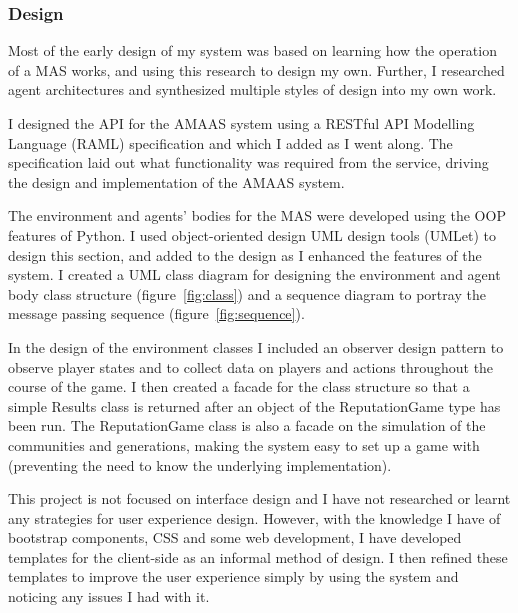 \documentclass[]{final_report}
\begin{document}
\subsubsection{Design}
Most of the early design of my system was based on learning how the operation of a MAS works, and using this research to design my own. Further, I researched agent architectures and synthesized multiple styles of design into my own work.\par 
I designed the API for the AMAAS system using a RESTful API Modelling Language (RAML) specification and which I added as I went along. The specification laid out what functionality was required from the service, driving the design and implementation of the AMAAS system.\par 
The environment and agents' bodies for the MAS were developed using the OOP features of Python. I used object-oriented design UML design tools (UMLet) to design this section, and added to the design as I enhanced the features of the system. I created a UML class diagram for designing the environment and agent body class structure (figure~\ref{fig:class}) and a sequence diagram to portray the message passing sequence (figure~\ref{fig:sequence}).\par 
In the design of the environment classes I included an observer design pattern to observe player states and to collect data on players and actions throughout the course of the game. I then created a facade for the class structure so that a simple Results class is returned after an object of the ReputationGame type has been run. The ReputationGame class is also a facade on the simulation of the communities and generations, making the system easy to set up a game with (preventing the need to know the underlying implementation).\par 
This project is not focused on interface design and I have not researched or learnt any strategies for user experience design. However, with the knowledge I have of bootstrap components, CSS and some web development, I have developed templates for the client-side as an informal method of design. I then refined these templates to improve the user experience simply by using the system and noticing any issues I had with it.
\end{document}
